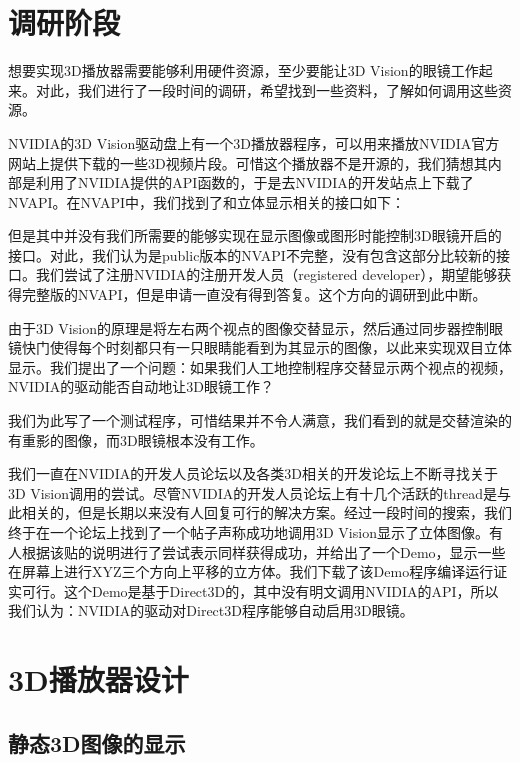 \section{调研阶段}
\label{sec:3Dplayersurvey}

想要实现3D播放器需要能够利用硬件资源，至少要能让3D Vision的眼镜工作起来。对此，我们进行了一段时间的调研，希望找到一些资料，了解如何调用这些资源。


NVIDIA的3D Vision驱动盘上有一个3D播放器程序，可以用来播放NVIDIA官方网站上提供下载的一些3D视频片段。可惜这个播放器不是开源的，我们猜想其内部是利用了NVIDIA提供的API函数的，于是去NVIDIA的开发站点上下载了NVAPI。在NVAPI中，我们找到了和立体显示相关的接口如下：

但是其中并没有我们所需要的能够实现在显示图像或图形时能控制3D眼镜开启的接口。对此，我们认为是public版本的NVAPI不完整，没有包含这部分比较新的接口。我们尝试了注册NVIDIA的注册开发人员（registered developer），期望能够获得完整版的NVAPI，但是申请一直没有得到答复。这个方向的调研到此中断。


由于3D Vision的原理是将左右两个视点的图像交替显示，然后通过同步器控制眼镜快门使得每个时刻都只有一只眼睛能看到为其显示的图像，以此来实现双目立体显示。我们提出了一个问题：如果我们人工地控制程序交替显示两个视点的视频，NVIDIA的驱动能否自动地让3D眼镜工作？

我们为此写了一个测试程序，可惜结果并不令人满意，我们看到的就是交替渲染的有重影的图像，而3D眼镜根本没有工作。


我们一直在NVIDIA的开发人员论坛以及各类3D相关的开发论坛上不断寻找关于3D Vision调用的尝试。尽管NVIDIA的开发人员论坛上有十几个活跃的thread是与此相关的，但是长期以来没有人回复可行的解决方案。经过一段时间的搜索，我们终于在一个论坛上找到了一个帖子声称成功地调用3D Vision显示了立体图像。有人根据该贴的说明进行了尝试表示同样获得成功，并给出了一个Demo，显示一些在屏幕上进行XYZ三个方向上平移的立方体。我们下载了该Demo程序编译运行证实可行。这个Demo是基于Direct3D的，其中没有明文调用NVIDIA的API，所以我们认为：NVIDIA的驱动对Direct3D程序能够自动启用3D眼镜。

\section{3D播放器设计}
\label{sec:3dplayerdesign}

\subsection{静态3D图像的显示}
\label{subsec:static3dimgdisp}

